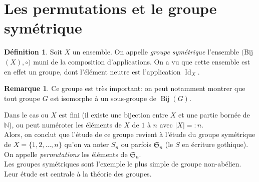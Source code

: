 \documentclass[oneside,12pt,french,table]{book}
\DeclareMathOperator{\id}{Id}
\DeclareMathOperator{\Bij}{Bij}
\theoremstyle{definition}
\theoremstyle{definition}
\theoremstyle{definition}
\newtheorem{definition}{Définition}[chapter]
\newtheorem*{remark}{Remarque}
\begin{document}
\section*{Les permutations et le groupe symétrique}
\begin{definition}
Soit $X$ un ensemble. On appelle \textit{groupe symétrique} l'ensemble $($Bij$(X),\circ)$ muni de la composition d'applications. On a vu que cette ensemble est en effet un groupe, dont l'élément neutre est l'application $\id_X$.
\end{definition}
\begin{remark}
Ce groupe est très important: on peut notamment montrer que tout groupe $G$ est isomorphe à un sous-groupe de $\Bij(G)$.
\end{remark}
Dans le cas ou $X$ est fini (il existe une bijection entre $X$ et une partie bornée de $\mathbb{N}$), ou peut numéroter les éléments de $X$ de $1$ à $n$ avec $\vert X \vert=:n$. \\ Alors, on conclut que l'étude de ce groupe revient à l'étude du groupe symétrique de  $X=\{1,2, \dots, n\}$ qu'on va noter $S_n$ ou parfois $\mathfrak{S}_n$ (le $S$ en écriture gothique). On appelle \textit{permutations} les éléments de $\mathfrak{S}_n$. \\
Les groupes symétriques sont l'exemple le plus simple de groupe non-abélien. Leur étude est centrale à la théorie des groupes.
\end{document}
